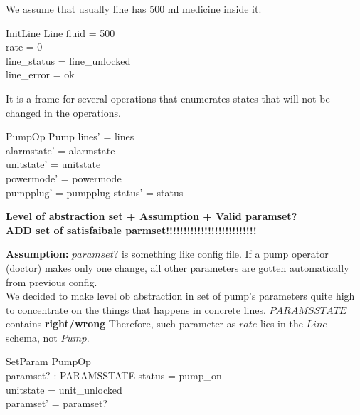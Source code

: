 \documentclass{article}
\begin{document}
	We assume that usually line has 500 ml medicine inside it.
	\begin{schema}{InitLine}
		Line
		\where
		fluid = 500 \\
		rate = 0 \\
		line\_status = line\_unlocked\\
		line\_error = ok \\
	\end{schema}

	It is a frame for several operations that enumerates states that will not be changed in the operations.
	\begin{schema}{PumpOp}
		\Delta Pump
	\where
    	lines' = lines  \\
    	alarmstate' = alarmstate \\
    	unitstate' = unitstate \\
    	powermode' = powermode \\
    	pumpplug' = pumpplug
    	status' = status \\
    \end{schema}
	

	\textbf{Level of abstraction set + Assumption + Valid paramset?\\
	ADD set of satisfaibale parmset!!!!!!!!!!!!!!!!!!!!!!!!!!}
	
	\textbf{Assumption:}  $paramset?$ is something like config file. If a pump operator (doctor) makes only one change, all other parameters are gotten automatically from previous config.\\
	We decided to make level ob abstraction in set of pump's parameters quite high to concentrate on the things that happens in concrete lines. $PARAMSSTATE$ contains \textbf{right/wrong} Therefore, such parameter as $rate$ lies in the $Line$ schema, not $Pump$.
	\begin{schema}{SetParam}
		PumpOp \\
		paramset? : PARAMSSTATE 
	\where
		status = pump\_on \\ 
		unitstate = unit\_unlocked \\
		paramset' = paramset?
	\end{schema}
\end{document}
